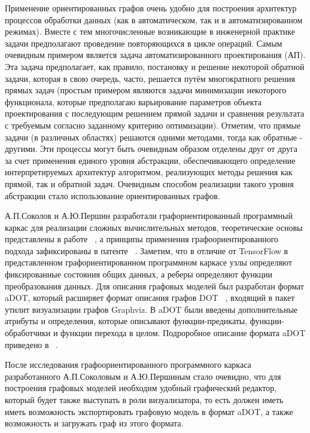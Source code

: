 Применение ориентированных графов очень удобно для построения архитектур процессов обработки данных (как в автоматическом, так и в автоматизированном режимах). Вместе с тем многочисленные возникающие в инженерной практике задачи предполагают проведение повторяющихся в цикле операций. Самым очевидным примером является задача автоматизированного проектирования (АП). Эта задача предполагает, как правило, постановку и решение некоторой обратной задачи, которая в свою очередь, часто, решается путём многократного решения прямых задач (простым примером являются задачи минимизации некоторого функционала, которые предполагаю варьирование параметров объекта проектирования с последующим решением прямой задачи и сравнения результата с требуемым согласно заданному критерию оптимизации). Отметим, что прямые задачи (в различных областях) решаются одними методами, тогда как обратные - другими. Эти процессы могут быть очевидным образом отделены друг от друга за счет применения единого уровня абстракции, обеспечивающего определение интерпретируемых архитектур  алгоритмом, реализующих методы решения как прямой, так и обратной задач. Очевидным способом реализации такого уровня абстракции стало использование ориентированных графов.

А.П.Соколов и А.Ю.Першин разработали графориентированный программный каркас для реализации сложных вычислительных методов, теоретические основы представлены в работе ~\cite{SokPersh2018GBSE}, а принципы применения графоориентированного подхода зафиксированы в патенте ~\cite{patentRU2681408}. Заметим, что в отличие от TensorFlow в представленном графориентированном программном каркасе узлы определяют фиксированные состояния общих данных, а реберы определяют функции преобразования данных. Для описания графовых моделей был разработан формат aDOT, который расширяет формат описания графов DOT ~\cite{GraphsDOT}, входящий в пакет утилит визуализации графов Graphviz. В aDOT были введены дополнительные атрибуты и определения, которые описывают функции-предикаты, функции-обработчики и функции перехода в целом. Подроробное описание формата aDOT приведено в ~\cite{SokADOT}.

После исследования графоориентированного программного каркаса разработанного А.П.Соколовым и А.Ю.Першиным стало очевидно, что для построения графовых моделей необходим удобный графический редактор, который будет также выступать в роли визуализатора, то есть должен иметь иметь возможность экспортировать графовую модель в формат aDOT, а также возможность и загружать граф из этого формата.

